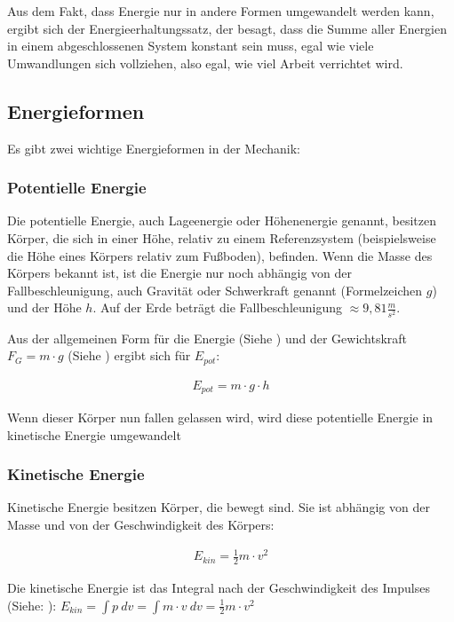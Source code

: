 Aus dem Fakt, dass Energie nur in andere Formen umgewandelt werden kann, ergibt sich der Energieerhaltungssatz, der besagt, dass die Summe aller Energien in einem abgeschlossenen System konstant sein muss, egal wie viele Umwandlungen sich vollziehen, also egal, wie viel Arbeit verrichtet wird. 


\subsection{Energieformen}

Es gibt zwei wichtige Energieformen in der Mechanik:

\subsubsection{Potentielle Energie}

Die potentielle Energie, auch Lageenergie oder Höhenenergie genannt, besitzen Körper, die sich in einer Höhe, relativ zu einem Referenzsystem (beispielsweise die Höhe eines Körpers relativ zum Fußboden), befinden. Wenn die Masse des Körpers bekannt ist, ist die Energie nur noch abhängig von der Fallbeschleunigung, auch Gravität oder Schwerkraft genannt (Formelzeichen $g$) und der Höhe $h$. Auf der Erde beträgt die Fallbeschleunigung $\approx 9,81 \frac{m}{s^2}$.

Aus der allgemeinen Form für die Energie (Siehe ) und der Gewichtskraft $F_G = m \cdot g$ (Siehe ) ergibt sich für $E_{pot}$:

\begin{align} \label{eq:epot}
	E_{pot} = m \cdot g \cdot h
\end{align}

\noindent Wenn dieser Körper nun fallen gelassen wird, wird diese potentielle Energie in kinetische Energie umgewandelt

\subsubsection{Kinetische Energie}

Kinetische Energie besitzen Körper, die bewegt sind. Sie ist abhängig von der Masse und von der Geschwindigkeit des Körpers:

\begin{align} \label{eq:ekin}
	E_{kin} = \frac{1}{2} m \cdot v^2
\end{align}

\begin{NiceToKnow}
	Die kinetische Energie ist das Integral nach der Geschwindigkeit des Impulses (Siehe: ): $E_{kin} = \int p \ dv = \int m \cdot v \ dv = \frac{1}{2} m \cdot v^2$
\end{NiceToKnow}

